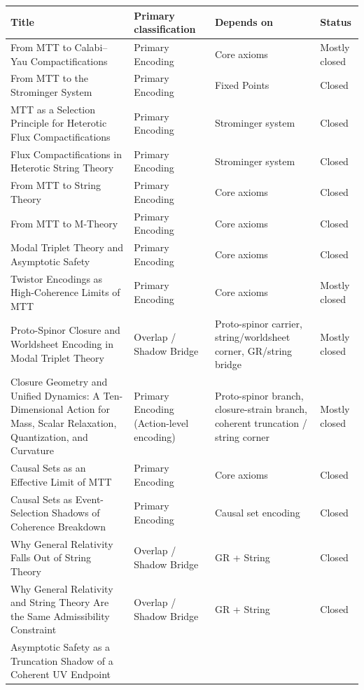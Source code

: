 \documentclass[11pt]{article}
\begin{document}
\begin{center}
\small
\begin{tabular}{|p{7.2cm}|p{3.6cm}|p{3.6cm}|p{1.6cm}|}
\hline
\textbf{Title} & \textbf{Primary classification} & \textbf{Depends on} & \textbf{Status}\\
\hline
From MTT to Calabi--Yau Compactifications
& Primary Encoding & Core axioms & Mostly closed\\
\hline
From MTT to the Strominger System
& Primary Encoding & Fixed Points & Closed\\
\hline
MTT as a Selection Principle for Heterotic Flux Compactifications
& Primary Encoding & Strominger system & Closed\\
\hline
Flux Compactifications in Heterotic String Theory
& Primary Encoding & Strominger system & Closed\\
\hline
From MTT to String Theory
& Primary Encoding & Core axioms & Closed\\
\hline
From MTT to M-Theory
& Primary Encoding & Core axioms & Closed\\
\hline
Modal Triplet Theory and Asymptotic Safety
& Primary Encoding & Core axioms & Closed\\
\hline
Twistor Encodings as High-Coherence Limits of MTT
& Primary Encoding & Core axioms & Mostly closed\\
\hline
Proto-Spinor Closure and Worldsheet Encoding in Modal Triplet Theory
& Overlap / Shadow Bridge & Proto-spinor carrier, string/worldsheet corner, GR/string bridge & Mostly closed\\
\hline
Closure Geometry and Unified Dynamics: A Ten-Dimensional Action for Mass, Scalar Relaxation, Quantization, and Curvature
& Primary Encoding (Action-level encoding) & Proto-spinor branch, closure-strain branch, coherent truncation / string corner & Mostly closed\\
\hline
Causal Sets as an Effective Limit of MTT
& Primary Encoding & Core axioms & Closed\\
\hline
Causal Sets as Event-Selection Shadows of Coherence Breakdown
& Primary Encoding & Causal set encoding & Closed\\
\hline
Why General Relativity Falls Out of String Theory
& Overlap / Shadow Bridge & GR + String & Closed\\
\hline
Why General Relativity and String Theory Are the Same Admissibility Constraint
& Overlap / Shadow Bridge & GR + String & Closed\\
\hline
Asymptotic Safety as a Truncation Shadow of a Coherent UV Endpoint

\end{tabular}
\end{center}
\end{document}
